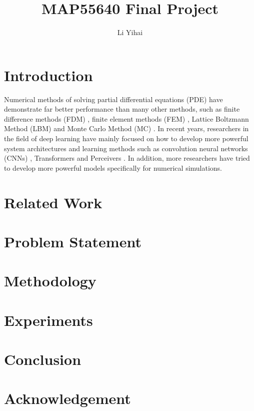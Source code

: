 \documentclass[manuscript, screen, review, language=english]{acmart}
\begin{document}
\title{MAP55640 Final Project}
\author{Li Yihai}



\begin{abstract}
\end{abstract}
    

\maketitle

\section{Introduction}
Numerical methods of solving partial differential equations (PDE) have 
demonstrate far better performance than many other methods, such as finite 
difference methods (FDM) \cite{}, 
finite element methods (FEM) \cite{}, 
Lattice Boltzmann Method (LBM) \cite{}
and Monte Carlo Method (MC) \cite{}.
In recent years, researchers in the field of deep learning have mainly focused 
on how to develop more powerful system architectures and learning methods such 
as convolution neural networks (CNNs) \cite{}, 
Transformers \cite{} 
and Perceivers \cite{} .
In addition, more researchers have tried to develop more powerful models specifically 
for numerical simulations.

\section{Related Work}
\section{Problem Statement}
\section{Methodology}
\section{Experiments}
\section{Conclusion}
\section{Acknowledgement}

\appendix
\end{document}
